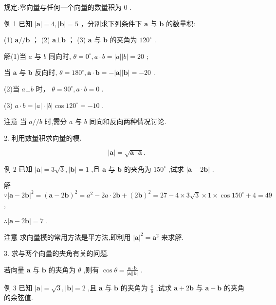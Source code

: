 \documentclass[10pt]{article}
\begin{document}
规定:零向量与任何一个向量的数量积为 0 .

例 1 已知 \(\left| \mathbf{a}\right|  = 4,\left| \mathbf{b}\right|  = 5\) ，分别求下列条件下 \(\mathbf{a}\) 与 \(\mathbf{b}\) 的数量积:

(1) \(\mathbf{a}//\mathbf{b}\) ； (2) \(\mathbf{a}\bot \mathbf{b}\) ； (3) \(\mathbf{a}\) 与 \(\mathbf{b}\) 的夹角为 \({120}^{ \circ  }\) .

解(1)当 \(a\) 与 \(b\) 同向时, \(\theta  = {0}^{ \circ  },a \cdot  b = \left| a\right| \left| b\right|  = {20}\) ;

当 \(\mathbf{a}\) 与 \(\mathbf{b}\) 反向时, \(\theta  = {180}^{ \circ  },\mathbf{a} \cdot  \mathbf{b} =  - \left| \mathbf{a}\right| \left| \mathbf{b}\right|  =  - {20}\) .

(2)当 \(a \bot  b\) 时， \(\theta  = {90}^{ \circ  },a \cdot  b = 0\) .

(3) \(a \cdot  b = \left| a\right|  \cdot  \left| b\right| \cos {120}^{ \circ  } =  - {10}\) .

注意 当 \(a//b\) 时,需分 \(a\) 与 \(b\) 同向和反向两种情况讨论.

2. 利用数量积求向量的模.

\[
\left| \mathbf{a}\right|  = \sqrt{\mathbf{a} \cdot  \mathbf{a}}.
\]

例 2 已知 \(\left| \mathbf{a}\right|  = 3\sqrt{3},\left| \mathbf{b}\right|  = 1\) ,且 \(\mathbf{a}\) 与 \(\mathbf{b}\) 的夹角为 \({150}^{ \circ  }\) ,试求 \(\left| {\mathbf{a} - 2\mathbf{b}}\right|\) .

解 \(\because {\left| \mathbf{a} - 2\mathbf{b}\right| }^{2} = {\left( \mathbf{a} - 2\mathbf{b}\right) }^{2} = {a}^{2} - {2a} \cdot  2\mathbf{b} + {\left( 2\mathbf{b}\right) }^{2} = {27} - 4 \times  3\sqrt{3} \times  1 \times  \cos {150}^{ \circ  } + 4 = {49}\) ,

\(\therefore \left| {\mathbf{a} - 2\mathbf{b}}\right|  = 7\) .

注意 求向量模的常用方法是平方法,即利用 \({\left| \mathbf{a}\right| }^{2} = {\mathbf{a}}^{2}\) 来求解.

3. 求与两个向量的夹角有关的问题.

若向量 \(\mathbf{a}\) 与 \(\mathbf{b}\) 的夹角为 \(\theta\) ,则有 \(\cos \theta  = \frac{\mathbf{a} \cdot  \mathbf{b}}{\left| \mathbf{a}\right| \left| \mathbf{b}\right| }\) .

例 3 已知 \(\left| \mathbf{a}\right|  = \sqrt{3},\left| \mathbf{b}\right|  = 2\) ,且 \(\mathbf{a}\) 与 \(\mathbf{b}\) 的夹角为 \(\frac{\pi }{6}\) ,试求 \(\mathbf{a} + 2\mathbf{b}\) 与 \(\mathbf{a} - \mathbf{b}\) 的夹角的余弦值.
\end{document}
